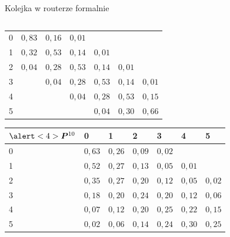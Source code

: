 \documentclass{mp}
\begin{document}
\begin{frame}{Kolejka w routerze formalnie}
{\begin{columns}[T]
\begin{column}{.49\textwidth}
{{\begin{tabular}{l|llllll}
0 & $0{,}83$ & $0{,}16$ & $0{,}01$ &  &  & \\
1 & $0{,}32$ & $0{,}53$ & $0{,}14$ & $0{,}01$ &  &  \\
2 & $0{,}04$ & $0{,}28$ & $0{,}53$ & $0{,}14$ & $0{,}01$ & \\
3 &  & $0{,}04$ & $0{,}28$ & $0{,}53$ & $0{,}14$ & $0{,}01$ \\
4 &  &  & $0{,}04$ & $0{,}28$ & $0{,}53$ & $0{,}15$ \\
5 &  &  &  & $0{,}04$ & $0{,}30$ & $0{,}66$
\end{tabular}
}
{
\begin{tabular}{l|llllll}
$\alert<4>{\bm{P}^{10}}$ & 0 & 1 & 2 & 3 & 4 & 5\\
\hline
 0 &  $0{,}63$ & $0{,}26$ & $0{,}09$ & $0{,}02$ &  &  \\
 1 &  $0{,}52$ & $0{,}27$ & $0{,}13$ & $0{,}05$ & $0{,}01$ &  \\
 2 &  $0{,}35$ & $0{,}27$ & $0{,}20$ & $0{,}12$ & $0{,}05$ & $0{,}02$ \\
 3 &  $0{,}18$ & $0{,}20$ & $0{,}24$ & $0{,}20$ & $0{,}12$ & $0{,}06$ \\
 4 &  $0{,}07$ & $0{,}12$ & $0{,}20$ & $0{,}25$ & $0{,}22$ & $0{,}15$ \\
 5 &  $0{,}02$ & $0{,}06$ & $0{,}14$ & $0{,}24$ & $0{,}30$ & $0{,}25$ \\
\end{tabular}
}
}
\end{column}
\end{columns}
}
\end{frame}
\end{document}

